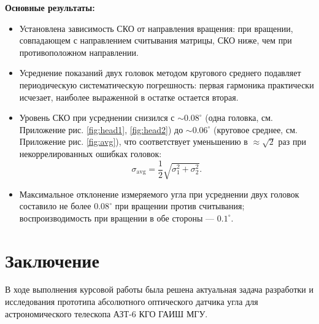 \textbf{Основные результаты:}
\begin{itemize}
    \item Установлена зависимость СКО от направления вращения: при вращении, совпадающем с направлением считывания матрицы, СКО ниже, чем при противоположном направлении.
    \item Усреднение показаний двух головок методом кругового среднего подавляет периодическую систематическую погрешность: первая гармоника практически исчезает, наиболее выраженной в остатке остается вторая.
    \item Уровень СКО при усреднении снизился с $\sim 0.08^\circ$ (одна головка, см. Приложение рис. \ref{fig:head1}, \ref{fig:head2}) до $\sim 0.06^\circ$ (круговое среднее, см. Приложение рис. \ref{fig:avg}), что соответствует уменьшению в $\approx\sqrt{2}$ раз при некоррелированных ошибках головок:
        \begin{equation*}
            \sigma_{\mathrm{avg}} = \frac{1}{2}\sqrt{\sigma_1^2 + \sigma_2^2}.
        \end{equation*}
    \item Максимальное отклонение измеряемого угла при усреднении двух головок составило не более $0.08^\circ$ при вращении против считывания; воспроизводимость при вращении в обе стороны --- $0.1^\circ$.
\end{itemize}

\section{Заключение}

В ходе выполнения курсовой работы была решена актуальная задача разработки и исследования прототипа абсолютного оптического датчика угла для астрономического телескопа АЗТ-6 КГО ГАИШ МГУ.

